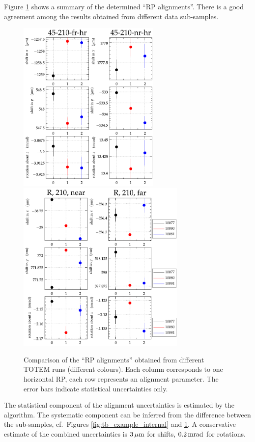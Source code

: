 \documentclass[TOTEM]{cern/cernphprep}
\def\un#1{\,{\rm #1}}
\begin{document}
Figure \ref{fig:tb_example_rp} shows a summary of the determined ``RP alignments''. There is a good agreement among the results obtained from different data sub-samples.

\begin{figure}[h!]
\begin{center}
\includegraphics[height=8.5cm]{fig/calibration_fill/plots_per_rp_left.pdf}
\includegraphics[height=8.5cm]{fig/calibration_fill/plots_per_rp_right.pdf}
\caption{%
Comparison of the ``RP alignments'' obtained from different TOTEM runs (different colours). Each column corresponds to one horizontal RP, each row represents an alignment parameter. The error bars indicate statistical uncertainties only.
}
\label{fig:tb_example_rp}
\end{center}
\end{figure}

The statistical component of the alignment uncertainties is estimated by the algorithm. The systematic component can be inferred from the difference between the sub-samples, cf.~Figures \ref{fig:tb_example_internal} and \ref{fig:tb_example_rp}. A conservative estimate of the combined uncertainties is $3\un{\mu m}$ for shifts, $0.2\un{mrad}$ for rotations.
\end{document}
